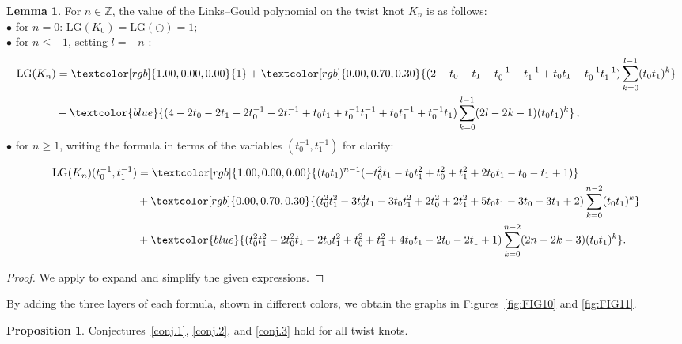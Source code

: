 \documentclass[12pt,reqno]{amsart}
\theoremstyle{definition}
\newtheorem{proposition}[theorem]{Proposition}
\newtheorem{lemma}[theorem]{Lemma}
\def\red#1{\textcolor{red}{#1}}
\def\blue#1{\textcolor{blue}{#1}}
\def\green#1{\textcolor{green}{#1}}
\def\red#1{\textcolor[rgb]{1.00,0.00,0.00}{#1}}
\def\green#1{\textcolor[rgb]{0.00,0.70,0.30}{#1}}
\def\LG{\mathrm{LG}}
\begin{document}
\begin{lemma}\label{valuewist}
    For $n \in \mathbb{Z}$, the value of the Links--Gould polynomial on the twist knot $K_n$ is as follows:\\
    $\bullet$ for $n = 0$:  $\LG(K_0) = \LG(\bigcirc) = 1 ;$\\
    $\bullet$ for $n \leq -1$, setting $l = -n$ :
    \begin{align*}
\LG(K_n)
& = \red{1} + \green{(2-t_0-t_1-t_0^{-1}-t_1^{-1} + t_0 t_1 + t_0^{-1} t_1^{-1}) \sum\limits_{k = 0}^{l-1} (t_0 t_1)^k} \\
& + \blue{(4 - 2 t_0 - 2 t_1 - 2 t_0^{-1} - 2 t_1^{-1} + t_0 t_1 + t_0^{-1} t_1^{-1} + t_0 t_1^{-1} + t_0^{-1} t_1) \sum\limits_{k = 0}^{l-1}(2 l - 2 k -1) (t_0 t_1)^k} \,;
\end{align*}
    $\bullet$ for $n \geq 1$, writing the formula in terms of the variables $(t_0^{-1}, t_1^{-1})$ for clarity:

\begin{samepage}    
    \begin{align*}
\LG(K_n)(t_0^{-1}, t_1^{-1})
& = \red{(t_0 t_1)^{n-1}(-t_0^2 t_1 - t_0 t_1^2 + t_0^2 + t_1^2 + 2 t_0 t_1 - t_0 - t_1 +1)} \\
& + \green{(t_0^2t_1^2 - 3 t_0^2 t_1 - 3 t_0 t_1^2 + 2 t_0^2 + 2 t_1^2 + 5 t_0 t_1 - 3 t_0 - 3 t_1 +2) \sum\limits_{k = 0}^{n-2} (t_0 t_1)^k} \\
& + \blue{(t_0^2 t_1^2 - 2 t_0^2 t_1 - 2 t_0 t_1^2 + t_0^2 + t_1^2 + 4 t_0 t_1 - 2 t_0 - 2 t_1 +1) \sum\limits_{k = 0}^{n-2}(2 n - 2 k -3) (t_0 t_1)^k}.
\end{align*}   
\end{samepage}
\end{lemma}

\begin{proof}
    We apply \cite[Prop. 2.18]{Kohli2} to expand and simplify the given expressions.
\end{proof}

By adding the three layers of each formula, shown in different colors, we obtain the graphs in Figures~\ref{fig:FIG10} and \ref{fig:FIG11}.



\begin{proposition}
Conjectures~\ref{conj.1}, \ref{conj.2}, and \ref{conj.3} hold for all twist knots.
\end{proposition}
\end{document}
